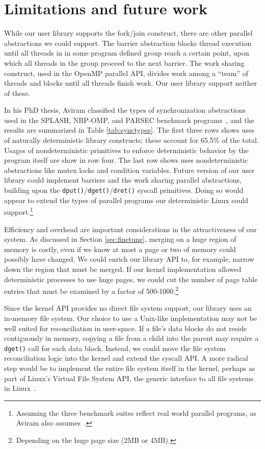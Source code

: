 
\section{Limitations and future work}



While our user library supports the fork/join construct, there are other
parallel abstractions we could support. The barrier abstraction
blocks thread execution until all threads in in some program defined group
reach a certain point, upon which all threads in the group proceed to the next
barrier. The work sharing construct, used in the OpenMP parallel API, divides
work among a ``team'' of threads and blocks until all threads finish work. Our
user library support neither of these.

In his PhD thesis, Aviram classified the types of synchronization abstractions
used in the SPLASH, NBP-OMP, and PARSEC benchmark
programs~\cite{aviram2011deterministic}, and the results are summarized in Table
\ref{tab:synctypes}. The first three rows shows uses of naturally deterministic
library constructs; these account for 65.5\% of the total. Usages of
nondeterministic primitives to enforce deterministic behavior by the program
itself are show in row four. The last row shows
uses nondeterministic abstractions like mutex locks and condition variables.
Future version of our user library could implement barriers and the work sharing
parallel abstractions,
building upon the {\tt dput()}/{\tt dget()}/{\tt dret()} syscall primitives.
Doing so would appear to extend the types of parallel
programs our deterministic Linux could support.\footnote{Assuming the three
benchmark suites reflect real world parallel programs, as Aviram also
assumes~\cite{aviram2011deterministic}.}

Efficiency and overhead are important considerations in the attractiveness of
our system. As discussed in Section \ref{sec:finetune}, merging on a huge
region of memory is costly, even if we know at most a page or two of memory
could possibly have changed. We could enrich our library API to, for example,
narrow down the region that must be merged. If our kernel implementation allowed
deterministic processes to use huge pages, we could cut the number of page
table entries that must be examined by a factor of 500-1000.\footnote{Depending
on the huge page size (2MB or 4MB).}

Since the kernel API provides no direct file system support, our library uses
an in-memory file system. Our choice to use a Unix-like implementation may not
be well suited for reconciliation in user-space. If a file's data blocks do not
reside contiguously in memory, copying a file from a child into the parent may
require a {\tt dget()} call for each data block. Instead, we could move the
file system reconciliation logic into the kernel and extend the syscall API. A
more radical step would be to implement the entire file system itself in the
kernel, perhaps as part of Linux's Virtual File System API, the generic
interface to all file systems in Linux~\cite{vfs}.

